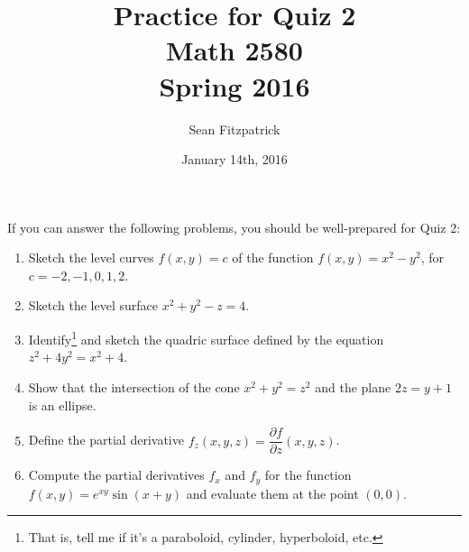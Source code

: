 \documentclass[letterpaper,12pt]{article}
\title{Practice for Quiz 2\\Math 2580\\Spring 2016}
\author{Sean Fitzpatrick}
\date{January 14th, 2016}
\begin{document}
 \maketitle

If you can answer the following problems, you should be well-prepared for Quiz 2:

\begin{enumerate}
 \item Sketch the level curves $f(x,y)=c$ of the function $f(x,y)=x^2-y^2$, for $c=-2,-1,0,1,2$.
 \item Sketch the level surface $x^2+y^2-z=4$.
 \item Identify\footnote{That is, tell me if it's a paraboloid, cylinder, hyperboloid, etc.} and sketch the quadric surface defined by the equation $z^2+4y^2=x^2+4$.
 \item Show that the intersection of the cone $x^2+y^2=z^2$ and the plane $2z=y+1$ is an ellipse.
 \item Define the partial derivative $f_z(x,y,z) = \dfrac{\partial f}{\partial z}(x,y,z)$.
 \item Compute the partial derivatives $f_x$ and $f_y$ for the function $f(x,y) =e^{xy}\sin(x+y)$ and evaluate them at the point $(0,0)$.
 
\end{enumerate}
\end{document}
